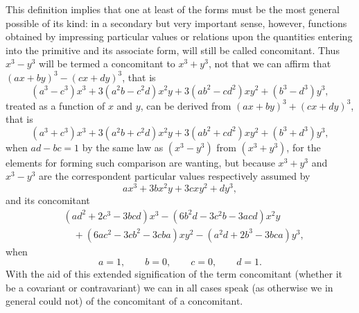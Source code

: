 \documentclass[11pt]{article}
\begin{document}
{{This definition implies that one at least of the forms must be the most general possible of its kind: in a secondary but very important sense, however, functions obtained by impressing particular values or relations upon the quantities entering into the primitive and its associate form, will still be called concomitant. Thus $x^3-y^3$ will be termed a concomitant to $x^3+y^3$, not that we can affirm that $(ax+by)^3-(cx+dy)^3$, that is
\[
(a^3-c^3)x^3+3(a^2b-c^2d)x^2y+3(ab^2-cd^2)xy^2+(b^3-d^3)y^3,
\]
treated as a function of $x$ and $y$, can be derived from $(ax+by)^3+(cx+dy)^3$, that is
\[
(a^3+c^3)x^3+3(a^2b+c^2d)x^2y+3(ab^2+cd^2)xy^2+(b^3+d^3)y^3,
\]
when $ad-bc=1$ by the same law as $(x^3-y^3)$ from $(x^3+y^3)$, for the elements for forming such comparison are wanting, but because $x^3+y^3$ and $x^3-y^3$ are the correspondent particular values respectively assumed by
\[
ax^3+3bx^2y+3cxy^2+dy^3,
\]
and its concomitant
\[
\begin{aligned}
&(ad^2+2c^3-3bcd)x^3-(6b^2d-3c^2b-3acd)x^2y\\
&\quad +(6ac^2-3cb^2-3cba)xy^2-(a^2d+2b^3-3bca)y^3,
\end{aligned}
\]
when
\[
a=1,\qquad b=0,\qquad c=0,\qquad d=1.
\]
With the aid of this extended signification of the term concomitant (whether it be a covariant or contravariant) we can in all cases speak (as otherwise we in general could not) of the concomitant of a concomitant.

}}
\end{document}
